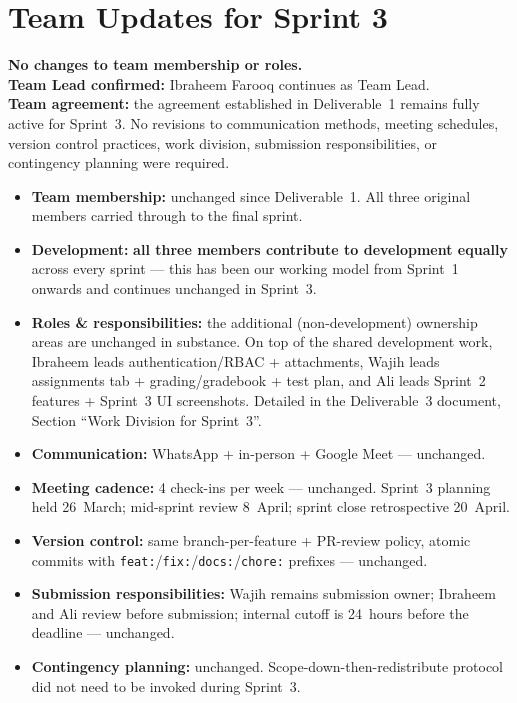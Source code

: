 \documentclass[11pt, legalpaper]{article}
\begin{document}
\section{Team Updates for Sprint 3}

\begin{infobox}[title=Status summary]
\textbf{No changes to team membership or roles.}\\
\textbf{Team Lead confirmed:} Ibraheem Farooq continues as Team Lead.\\
\textbf{Team agreement:} the agreement established in Deliverable~1 remains
fully active for Sprint~3. No revisions to communication methods, meeting
schedules, version control practices, work division, submission
responsibilities, or contingency planning were required.
\end{infobox}

\begin{itemize}
  \item \textbf{Team membership:} unchanged since Deliverable~1. All three
        original members carried through to the final sprint.
  \item \textbf{Development:} \textbf{all three members contribute to
        development equally} across every sprint --- this has been our
        working model from Sprint~1 onwards and continues unchanged in
        Sprint~3.
  \item \textbf{Roles \& responsibilities:} the additional (non-development)
        ownership areas are unchanged in substance. On top of the shared
        development work, Ibraheem leads authentication/RBAC + attachments,
        Wajih leads assignments tab + grading/gradebook + test plan, and Ali
        leads Sprint~2 features + Sprint~3 UI screenshots. Detailed in the
        Deliverable~3 document, Section ``Work Division for Sprint~3''.
  \item \textbf{Communication:} WhatsApp + in-person + Google Meet — unchanged.
  \item \textbf{Meeting cadence:} 4 check-ins per week — unchanged. Sprint~3
        planning held 26~March; mid-sprint review 8~April; sprint close
        retrospective 20~April.
  \item \textbf{Version control:} same branch-per-feature + PR-review policy,
        atomic commits with \texttt{feat:}/\texttt{fix:}/\texttt{docs:}/\texttt{chore:}
        prefixes — unchanged.
  \item \textbf{Submission responsibilities:} Wajih remains submission owner;
        Ibraheem and Ali review before submission; internal cutoff is
        24~hours before the deadline — unchanged.
  \item \textbf{Contingency planning:} unchanged. Scope-down-then-redistribute
        protocol did not need to be invoked during Sprint~3.
\end{itemize}
\end{document}
